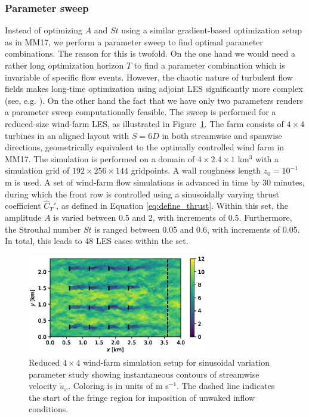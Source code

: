 \documentclass[wes, manuscript]{copernicus}
\newcommand{\cthat}{\widehat{C}_T'}
\begin{document}
\subsubsection{Parameter sweep}
Instead of optimizing $A$ and $St$ using a similar gradient-based optimization setup as in MM17, we perform a parameter sweep to find optimal parameter combinations. The reason for this is twofold. On the one hand we would need a rather long optimization horizon $T$ to find a parameter combination which is invariable of specific flow events. However, the chaotic nature of turbulent flow fields makes long-time optimization using adjoint LES significantly more complex (see, e.g. \cite{wang2014least}). On the other hand the fact that we have only two parameters renders a parameter sweep computationally feasible. The sweep is performed for a reduced-size wind-farm LES, as illustrated in Figure~\ref{fig:sinus_setup}. The farm consists of $4 \times 4$ turbines in an aligned layout with $S = 6D$ in both streamwise and spanwise directions, geometrically equivalent to the optimally controlled wind farm in MM17. The simulation is performed on a domain of $4 \times 2.4 \times 1$ km$^3$ with a simulation grid of $192 \times 256 \times 144$ gridpoints. A wall roughness length $z_0 = 10^{-1}$ m is used. A set of wind-farm flow simulations is advanced in time by 30 minutes, during which the front row is controlled using a sinusoidally varying thrust coefficient $\cthat$, as defined in Equation \eqref{eq:define_thrust}. Within this set, the amplitude $A$ is varied between 0.5 and 2, with increments of 0.5. Furthermore, the Strouhal number $St$ is ranged between 0.05 and 0.6, with increments of 0.05. In total, this leads to 48 LES cases within the set. 

\begin{figure}
	\centering
	\includegraphics[width=0.7\textwidth]{setup_sinusoidal.eps}
	\caption{Reduced $4 \times 4$ wind-farm simulation setup for sinusoidal variation parameter study showing instantaneous contours of streamwise velocity $\widetilde{u}_x$. Coloring is in units of m s$^{-1}$. The dashed line indicates the start of the fringe region for imposition of unwaked inflow conditions. \label{fig:sinus_setup}}
\end{figure}
\end{document}
